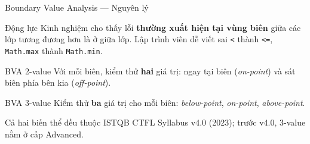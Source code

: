 \documentclass[aspectratio=169,12pt]{beamer}
\begin{document}
\begin{frame}{Boundary Value Analysis --- Nguyên lý}
  \begin{block}{Động lực}
    Kinh nghiệm cho thấy lỗi \textbf{thường xuất hiện tại vùng biên}
    giữa các lớp tương đương hơn là ở giữa lớp.
    Lập trình viên dễ viết sai \texttt{<} thành \texttt{<=},
    \texttt{Math.max} thành \texttt{Math.min}.
  \end{block}

  \vspace{0.4em}
  \begin{block}{BVA 2-value}
    Với mỗi biên, kiểm thử \textbf{hai} giá trị:
    ngay tại biên (\textit{on-point}) và sát biên phía bên kia
    (\textit{off-point}).
  \end{block}

  \begin{block}{BVA 3-value}
    Kiểm thử \textbf{ba} giá trị cho mỗi biên:
    \textit{below-point}, \textit{on-point}, \textit{above-point}.
  \end{block}

  \vspace{0.2em}
  {\scriptsize Cả hai biến thể đều thuộc ISTQB CTFL Syllabus v4.0 (2023);
  trước v4.0, 3-value nằm ở cấp Advanced.}
\end{frame}
\end{document}
